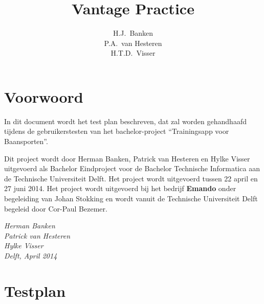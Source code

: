 \documentclass[dutch]{style/tudelft-report}
\begin{document}
\def \mylaps {MyLaps\xspace}


\frontmatter

\title[Bachelorproject \\ ~ \\ Testplan]{Vantage Practice}
\author{H.J.\ Banken \\ P.A.\ van Hesteren \\ H.T.D.\ Visser}



\chapter{Voorwoord}
In dit document wordt het test plan beschreven, dat zal worden gehandhaafd tijdens de gebruikerstesten van het bachelor-project “Trainingsapp voor Baansporten”. 

\bigskip

\noindent
Dit project wordt door Herman Banken, Patrick van Hesteren en Hylke Visser uitgevoerd als Bachelor Eindproject voor de Bachelor Technische Informatica aan de Technische Universiteit Delft. Het project wordt uitgevoerd tussen 22 april en 27 juni 2014. Het project wordt uitgevoerd bij het bedrijf \textbf{Emando} onder begeleiding van Johan Stokking en wordt vanuit de Technische Universiteit Delft begeleid door Cor-Paul Bezemer. 

\bigskip

\begin{flushright}
{\makeatletter\itshape
    Herman Banken \\
    Patrick van Hesteren \\
    Hylke Visser \\
    Delft, April 2014
\makeatother}
\end{flushright}

\tableofcontents

\mainmatter

\chapter{Testplan} \label{ch:testplan} 


\end{document}
